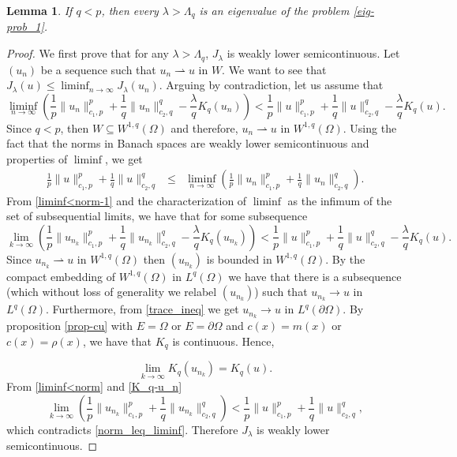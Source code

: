 \documentclass[pdflatex,sn-mathphys-num]{sn-jnl}
\theoremstyle{thmstyleone}%
\newtheorem{lem}[theorem]{Lemma}
\theoremstyle{thmstyletwo}%
\theoremstyle{thmstylethree}%
\theoremstyle{thmstylethree}%
\begin{document}
\begin{lem}\label{1-exist-eigen}
    If $q<p$, then every $\lambda >\Lambda_q$ is an eigenvalue of the problem \eqref{eig-prob_1}.
\end{lem}
\begin{proof}
We first prove that for any $\lambda > \Lambda_q$, $J_\lambda$ is weakly lower semicontinuous. Let $(u_n)$ be a sequence such that $u_n \rightharpoonup u$ in $W$.
We want to see that $  \displaystyle{  J_\lambda (u) \leqslant \liminf_{n\to \infty} J_\lambda (u_n)}$. 
Arguing by contradiction, let us assume that 
\begin{equation}\label{liminf<norm-1}
 \liminf_{n\to \infty} \left(\frac{1}p \|u_n\|_{c_1,p}^p + \frac{1}q \|u_n\|_{c_2,q}^q - \frac{\lambda}q K_{q}(u_n) \right) <   \frac{1}p \|u\|_{c_1,p}^p+\frac{1}q \|u\|_{c_2,q}^q- \frac{\lambda}q K_{q}(u).
\end{equation}
Since $q<p$, then  $W\subseteq W^{1,q}(\Omega)$ and therefore, $u_n \rightharpoonup u$ in $W^{1,q}(\Omega)$. Using the fact that the norms in Banach spaces  are weakly lower semicontinuous and properties of $\liminf$, we get
\begin{eqnarray}\label{norm_leq_liminf}
   \frac{1}p \|u\|_{c_1,p}^p+\frac{1}q \|u\|_{c_2,q}^q 
   &\leqslant & \liminf_{n\to \infty} \left(\frac{1}p \|u_n\|_{c_1,p}^p + \frac{1}q \|u_n\|_{c_2,q}^q \right).
\end{eqnarray}
From \eqref{liminf<norm-1} and the characterization of $\liminf$ as the infimum of the set of subsequential limits, we have that for some subsequence 
\begin{equation}\label{liminf<norm}
 \lim_{k\to \infty} \left(\frac{1}p \|u_{n_k}\|_{c_1,p}^p + \frac{1}q \|u_{n_k}\|_{c_2,q}^q - \frac{\lambda}q K_{q}(u_{n_k}) \right) <   \frac{1}p \|u\|_{c_1,p}^p+\frac{1}q \|u\|_{c_2,q}^q- \frac{\lambda}q K_{q}(u) .
\end{equation}
Since $u_{n_k} \rightharpoonup u$ in $W^{1,q}(\Omega)$ then $(u_{n_k})$ is bounded in $W^{1,q}(\Omega)$. By the compact embedding of $W^{1,q}(\Omega)$ in  $L^q(\Omega)$ we have that there is a  subsequence  (which without loss of generality we relabel $(u_{n_k})$) such  that $u_{n_k}\to u$ in $L^q(\Omega)$. 
Furthermore, from \eqref{trace_ineq} we get $u_{n_k}\to u$ in $L^{q}(\partial\Omega)$. By proposition \ref{prop-cu}  with $E=\Omega$ or $E=\partial\Omega$ and $c(x)=m(x)$ or $c(x)=\rho(x)$, we have that $K_q$ is continuous. Hence,

\begin{equation}\label{K_q-u_n}
    \lim_{k\to \infty}K_q(u_{n_k})=K_q(u).
\end{equation}
From \eqref{liminf<norm}  and \eqref{K_q-u_n} 
\begin{equation*}
\lim_{k\to \infty} \left(\frac{1}p \|u_{n_k}\|_{c_1,p}^p + \frac{1}q \|u_{n_k}\|_{c_2,q}^q \right) <   \frac{1}p \|u\|_{c_1,p}^p+\frac{1}q \|u\|_{c_2,q}^q,
\end{equation*}
which contradicts \eqref{norm_leq_liminf}. Therefore $J_\lambda$ is weakly lower semicontinuous. 


\end{proof}
\end{document}
